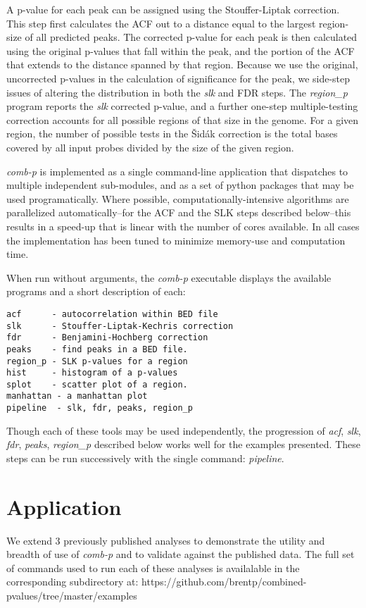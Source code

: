 \documentclass{bioinfo}
\begin{document}
\begin{methods}
A p-value for each peak can be assigned using the Stouffer-Liptak
correction. This step first calculates the ACF out to a distance
equal to the largest region-size of all predicted peaks. The corrected
p-value for each peak is then calculated using the original p-values
that fall within the peak, and the portion of the ACF that extends to
the distance spanned by that region. Because we use the original,
uncorrected p-values in the calculation of significance for the peak,
we side-step issues of altering the distribution in both the
\textit{slk} and FDR steps. The \textit{region\_p} program reports the
\textit{slk} corrected p-value, and a further one-step \cite{Sidak}
multiple-testing correction accounts for all possible regions of that
size in the genome. For a given region, the number of possible tests
in the \v{S}id\'{a}k correction is the total bases covered by all input probes
divided by the size of the given region.

\textit{comb-p} is implemented as a single command-line application that
dispatches to multiple independent sub-modules, and as a set of python
packages that may be used programatically. Where possible,
computationally-intensive algorithms are parallelized
automatically--for the ACF and the SLK steps described below--this
results in a speed-up that is linear with the number of cores available.
In all cases the implementation has been tuned to minimize memory-use and
computation time.

When run without arguments, the \textit{comb-p} executable displays the
available programs and a short description of each:
\begin{verbatim}
acf      - autocorrelation within BED file
slk      - Stouffer-Liptak-Kechris correction
fdr      - Benjamini-Hochberg correction
peaks    - find peaks in a BED file.
region_p - SLK p-values for a region
hist     - histogram of a p-values
splot    - scatter plot of a region.
manhattan - a manhattan plot
pipeline  - slk, fdr, peaks, region_p
\end{verbatim}

Though each of these tools may be used independently, the progression of
\textit{acf}, \textit{slk}, \textit{fdr}, \textit{peaks}, \textit{region\_p}
described below works well for the examples presented. These steps can
be run successively with the single command: \textit{pipeline}.

\section{Application}
We extend 3 previously published analyses to demonstrate the utility and
breadth of use of \textit{comb-p} and to validate against the
published data. The full set of commands used to run each of these analyses
is availalable in the corresponding subdirectory at:
https://github.com/brentp/combined-pvalues/tree/master/examples


\end{methods}
\end{document}
